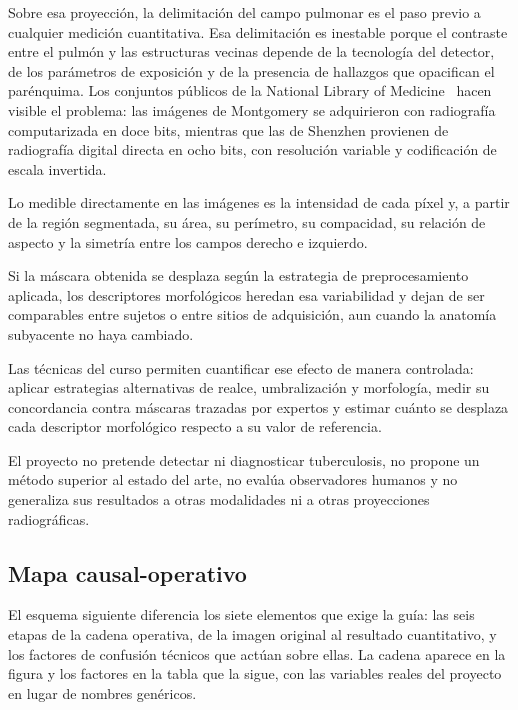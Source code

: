 \documentclass[12pt,a4paper]{article}
\begin{document}
Sobre esa proyección, la delimitación del campo pulmonar es el paso previo a
cualquier medición cuantitativa. Esa delimitación es inestable porque el
contraste entre el pulmón y las estructuras vecinas depende de la tecnología del
detector, de los parámetros de exposición y de la presencia de hallazgos que
opacifican el parénquima. Los conjuntos públicos de la National Library of
Medicine~\cite{jaeger2014} hacen visible el problema: las imágenes de Montgomery se adquirieron con
radiografía computarizada en doce bits, mientras que las de Shenzhen provienen de
radiografía digital directa en ocho bits, con resolución variable y codificación
de escala invertida.

Lo medible directamente en las imágenes es la intensidad de cada píxel y, a
partir de la región segmentada, su área, su perímetro, su compacidad, su relación
de aspecto y la simetría entre los campos derecho e izquierdo.

Si la máscara obtenida se desplaza según la estrategia de preprocesamiento
aplicada, los descriptores morfológicos heredan esa variabilidad y dejan de ser
comparables entre sujetos o entre sitios de adquisición, aun cuando la anatomía
subyacente no haya cambiado.

Las técnicas del curso permiten cuantificar ese efecto de manera controlada:
aplicar estrategias alternativas de realce, umbralización y morfología, medir su
concordancia contra máscaras trazadas por expertos y estimar cuánto se desplaza
cada descriptor morfológico respecto a su valor de referencia.

El proyecto no pretende detectar ni diagnosticar tuberculosis, no propone un
método superior al estado del arte, no evalúa observadores humanos y no
generaliza sus resultados a otras modalidades ni a otras proyecciones
radiográficas.

\subsection{Mapa causal-operativo}

El esquema siguiente diferencia los siete elementos que exige la guía: las seis
etapas de la cadena operativa, de la imagen original al resultado cuantitativo, y
los factores de confusión técnicos que actúan sobre ellas. La cadena aparece en la
figura y los factores en la tabla que la sigue, con las variables reales del
proyecto en lugar de nombres genéricos.
\end{document}
